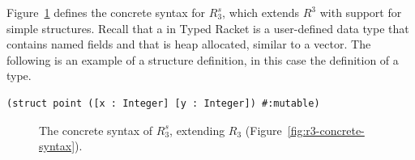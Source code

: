 \documentclass[11pt]{book}
\newcommand{\gray}[1]{{\color{gray} #1}}
\begin{document}
Figure~\ref{fig:r3s-concrete-syntax} defines the concrete syntax for
$R^s_3$, which extends $R^3$ with support for simple structures.
Recall that a  in Typed Racket is a user-defined data
type that contains named fields and that is heap allocated, similar to
a vector. The following is an example of a structure definition, in
this case the definition of a  type.
\begin{lstlisting}
(struct point ([x : Integer] [y : Integer]) #:mutable)
\end{lstlisting}

\begin{figure}[tbp]
\centering
\fbox{
\begin{minipage}{0.96\textwidth}
\[
\begin{array}{lcl}
  \Type &::=& \gray{\key{Integer} \mid \key{Boolean}
  \mid (\key{Vector}\;\Type \ldots) \mid \key{Void} } \mid \Var \\
  \itm{cmp} &::= & \gray{ \key{eq?} \mid \key{<} \mid \key{<=} \mid \key{>} \mid \key{>=} } \\
  \Exp &::=& \gray{  \Int \mid (\key{read}) \mid (\key{-}\;\Exp) \mid (\key{+} \; \Exp\;\Exp) \mid (\key{-}\;\Exp\;\Exp) }  \\
  &\mid&  \gray{  \Var \mid (\key{let}~([\Var~\Exp])~\Exp)  }\\
  &\mid& \gray{ \key{\#t} \mid \key{\#f} 
   \mid (\key{and}\;\Exp\;\Exp) 
   \mid (\key{or}\;\Exp\;\Exp)
   \mid (\key{not}\;\Exp) } \\
  &\mid& \gray{  (\itm{cmp}\;\Exp\;\Exp) 
   \mid (\key{if}~\Exp~\Exp~\Exp)  } \\
  &\mid& \gray{ (\key{vector}\;\Exp \ldots) 
   \mid (\key{vector-ref}\;\Exp\;\Int) } \\
  &\mid& \gray{ (\key{vector-set!}\;\Exp\;\Int\;\Exp) }\\
  &\mid& \gray{ (\key{void}) } \mid (\Var\;\Exp \ldots)\\
  \Def &::=& (\key{struct}\; \Var \; ([\Var \,\key{:}\, \Type] \ldots)\; \code{\#:mutable})\\
  R_3 &::=& \Def \ldots \; \Exp
\end{array}
\]
\end{minipage}
}
\caption{The concrete syntax of $R^s_3$, extending $R_3$
  (Figure~\ref{fig:r3-concrete-syntax}).}
\label{fig:r3s-concrete-syntax}
\end{figure}
\end{document}
